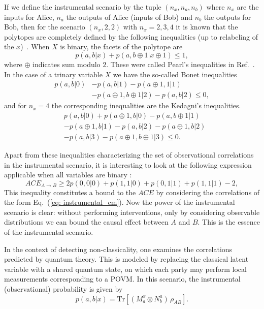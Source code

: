 \documentclass[aps,pra,reprint, superscriptaddress,showkeys]{revtex4-2}
\theoremstyle{plain}
\begin{document}
If we define  the instrumental scenario by the tuple \( (n_x, n_a, n_b) \) where \( n_x \) are the inputs for Alice, \( n_a  \) the outputs of Alice (inputs of Bob)  and \( n_b \) the  outputs for Bob, then for the scenario $(n_x,2,2)$ with $n_x=2,3,4$ it is known that the polytopes are completely defined by the following inequalities (up to relabeling of the $x$)~\cite{inst_inequalities_x}.
When $X$ is binary, the facets of the polytope are
\begin{equation}
    p(a,b|x) + p(a,b\oplus1|x\oplus1) \leq1,
\end{equation}
where $\oplus$ indicates sum modulo $2$.  These were called Pearl's inequalities in Ref.~\cite{pearl1995causal}. In the case of  a trinary variable $X$ we have the so-called Bonet inequalities~\cite{bonet_inequalities}
\begin{align}
    p(a,b|0) &- p(a,b|1) -p(a\oplus1,1|1)\nonumber\\&-p(a\oplus1,b\oplus1|2) - p(a,b|2) \leq 0,
\end{align}
and for  $n_x=4$ the corresponding inequalities are the Kedagni's inequalities.
\begin{align}
    &p(a, b|0) + p(a\oplus1, b|0) - p(a, b\oplus1|1)\nonumber\\ &- p(a\oplus1, b|1) - p(a, b|2) - p(a\oplus1, b|2)\nonumber\\ &- p(a, b|3) - p(a\oplus1, b\oplus1|3) \leq 0.
\end{align}

Apart from these inequalities characterizing the set of observational correlations in the instrumental scenario, it is interesting to look at the following expression applicable when all variables are binary \cite{GMR_QCI}:
\begin{equation}
    ACE_{A\rightarrow B} \geq
2p(0, 0|0) + p(1, 1|0) + p(0, 1|1) + p(1, 1|1) - 2,\label{eq: ACE_ineq}
\end{equation}
This inequality constitutes a bound to the $ACE$ by considering the correlations of the form Eq.~(\ref{eq: instrumental_cm}). Now the power of the instrumental scenario  is  clear: without performing interventions, only by considering observable distributions we can bound the causal effect between $A$ and $B$. This is the essence of the instrumental scenario. 

In the context of detecting non-classicality, one examines the correlations predicted by quantum theory. This is modeled by replacing the classical latent variable with a shared quantum state, on which each party may perform local measurements corresponding to a POVM. In this scenario, the instrumental (observational) probability is given by 
\begin{equation}
p(a,b|x) = \mathrm{Tr}\left[(M^x_a \otimes N^a_b) \, \rho_{AB}\right].
\end{equation}
\end{document}
